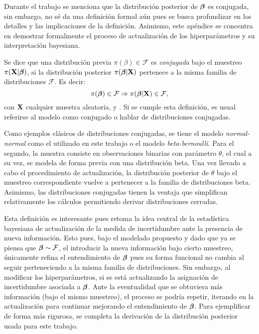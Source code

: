 \documentclass[../../Main/Main.tex]{subfiles}
\begin{document}
Durante el trabajo se menciona que la distribución posterior de $\bm{\beta}$ es conjugada, sin embargo, no sé da una definición formal aún pues se busca profundizar en los detalles y las implicaciones de la definición. Asimismo, este apéndice se concentra en demostrar formalmente el proceso de actualización de los hiperparámetros y su interpretación bayesiana. \\

\begin{definition}
Se dice que una distribución previa $\pi(\beta)\in\mathcal{F}$  es \emph{conjugada} bajo el muestreo $\pi(\mathbf{X}|\bm{\beta})$, si la distribución posterior $\pi(\bm{\beta}|\mathbf{X})$ pertenece a la misma familia de distribuciones $\mathcal{F}$. Es decir: $$\pi(\bm{\beta}) \in \mathcal{F} \Rightarrow \pi(\bm{\beta}|\mathbf{X}) \in \mathcal{F}, $$ con $\mathbf{X}$ cualquier muestra aleatoria, \citet{mendoza2011estadistica} y \citet{barber2010bayesian}. Si se cumple esta definición, es usual referirse al modelo como conjugado o hablar  de distribuciones conjugadas.
\end{definition}
Como ejemplos clásicos de distribuciones conjugadas, se tiene el modelo \textit{normal-normal} como el utilizado en este trabajo o el modelo \textit{beta-bernoulli}. Para el segundo, la muestra consiste en observaciones binarias con parámetro $\theta$, el cual a su vez, se modela de forma previa con una distribución beta. Una vez llevado a cabo el procedimiento de actualización, la distribución posterior de $\theta$ bajo el muestreo correspondiente vuelve a pertenecer a la familia de distribuciones beta. Asimismo, las distribuciones conjugadas tienen la ventaja que simplifican relativamente los cálculos permitiendo derivar distribuciones cerradas.

Esta definición es interesante pues retoma la idea central de la estadística bayesiana de actualización de la medida de incertidumbre ante la presencia de nueva información. Esto pues, bajo el modelado propuesto y dado que ya se piensa que $\bm{\beta}\sim\mathcal{F}$, el introducir la nueva información bajo cierto muestreo, únicamente refina el entendimiento de $\bm{\beta}$ pues su forma funcional no cambia al seguir perteneciendo a la misma familia de distribuciones. Sin embargo, al modificar los hiperparámetros, si se está actualizando la asignación de incertidumbre asociada a $\bm{\beta}$.  Ante la eventualidad que se obtuviera más información (bajo el mismo muestreo), el proceso se podría repetir, iterando en la actualización para continuar mejorando el entendimiento de $\bm{\beta}$. Para ejemplificar de forma más rigurosa, se completa la derivación de la distribución posterior usada para este trabajo.\\
\end{document}
